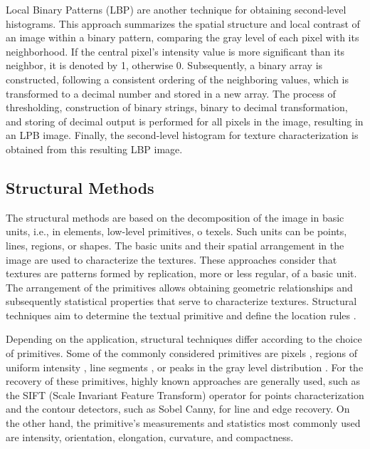 Local Binary Patterns (LBP) \citep{Ojala.Pietikainen.ea:PR:1996} are another technique for obtaining second-level histograms. This approach summarizes the spatial structure and local contrast of an image within a binary pattern, comparing the gray level of each pixel with its neighborhood. If the central pixel's intensity value is more significant than its neighbor, it is denoted by 1, otherwise 0. Subsequently, a binary array is constructed, following a consistent ordering of the neighboring values, which is transformed to a decimal number and stored in a new array. The process of thresholding, construction of binary strings, binary to decimal transformation, and storing of decimal output is performed for all pixels in the image, resulting in an LPB image. Finally, the second-level histogram for texture characterization is obtained from this resulting LBP image.


\subsection{Structural Methods}
The structural methods are based on the decomposition of the image in basic units, i.e., in elements, low-level primitives, o texels. Such units can be points, lines, regions, or shapes. The basic units and their spatial arrangement in the image are used to characterize the textures. These approaches consider that textures are patterns formed by replication, more or less regular, of a basic unit. The arrangement of the primitives allows obtaining geometric relationships and subsequently statistical properties that serve to characterize textures. Structural techniques aim to determine the textual primitive and define the location rules \citep{Humeau-Heurtier:IEEEAccess:2019}.

Depending on the application, structural techniques differ according to the choice of primitives. Some of the commonly considered primitives are pixels \citep{Lu.Fu:CGIP:1978}, regions of uniform intensity \citep{Tuceryan.Jain:WS:1993}, line segments \citep{Carlucci:PR:1972}, or peaks in the gray level distribution \citep{Ehrich.Foith:CGIP:1978}. For the recovery of these primitives, highly known approaches are generally used, such as the SIFT (Scale Invariant Feature Transform) operator for points characterization and the contour detectors, such as Sobel Canny, for line and edge recovery. On the other hand, the primitive's measurements and statistics most commonly used are intensity, orientation, elongation, curvature, and compactness.

